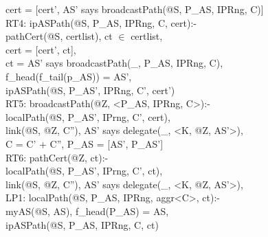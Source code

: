 \begin{code}
\> cert = [cert', AS' says broadcastPath(@S, P\_AS, IPRng, C)]\\
RT4: ipASPath(@S, P\_AS, IPRng, C, cert):-\\
\> pathCert(@S, certlist), ct $\in$ certlist,\\
\> cert = [cert', ct],\\
\> ct = AS' says broadcastPath(\_, P\_AS, IPRng, C),\\
\> f\_head(f\_tail(p\_AS)) = AS',\\
\> ipASPath(@S, P\_AS', IPRng, C', cert')\\
RT5: broadcastPath(@Z, <P\_AS, IPRng, C>):-\\
\> localPath(@S, P\_AS', IPrng, C', cert),\\
\> link(@S, @Z, C''), AS' says delegate(\_, <K, @Z, AS'>),\\
\> C = C' + C'', P\_AS = [AS', P\_AS']\\
RT6: pathCert(@Z, ct):-\\
\> localPath(@S, P\_AS', IPrng, C', ct),\\
\> link(@S, @Z, C''), AS' says delegate(\_, <K, @Z, AS'>),\\
LP1: localPath(@S, P\_AS, IPRng, aggr<C>, ct):-\\
\> myAS(@S, AS), f\_head(P\_AS) = AS,\\
\> ipASPath(@S, P\_AS, IPRng, C, ct)
\end{code}

